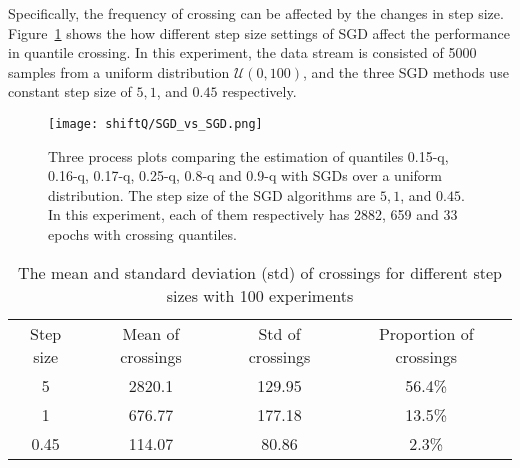 Specifically, the frequency of crossing can be affected by the changes in step size. Figure~\ref{fig: SGD_SGD} shows the how different step size settings of SGD affect the performance in quantile crossing. In this experiment, the data stream is consisted of 5000 samples from a uniform distribution $\mathcal{U}(0,100)$, and the three SGD methods use constant step size of $5, 1$, and $0.45$ respectively. 
    \begin{figure}[h!]
        \texttt{[image: shiftQ/SGD\_vs\_SGD.png]}
        \caption{Three process plots comparing the estimation of quantiles 0.15-q, 0.16-q, 0.17-q, 0.25-q, 0.8-q and 0.9-q with SGDs over a uniform distribution. The step size of the SGD algorithms are $5, 1$, and $0.45$. In this experiment, each of them respectively has 2882, 659 and 33 epochs with crossing quantiles.}
        \label{fig: SGD_SGD}
    \end{figure}

    \begin{table}[h!]
        \centering
        \caption{The mean and standard deviation (std) of crossings for different step sizes with 100 experiments}
        \begin{tabular}{cccc}
        \toprule
        Step size & Mean of crossings   & Std of crossings              & Proportion of crossings\\ 
        5         & 2820.1              & 129.95                        & 56.4\%                 \\
        1         & 676.77              & 177.18                        & 13.5\%                 \\
        0.45      & 114.07              & 80.86                         & 2.3\%      \\
        \bottomrule
        \end{tabular}
        \label{tab: SGD_SGD}
    \end{table}

